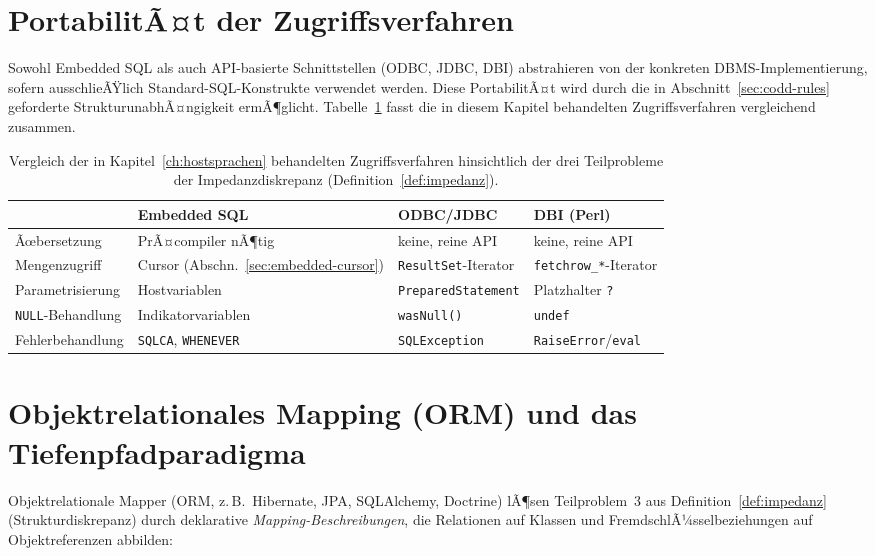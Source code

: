 ﻿\documentclass[a4paper,12pt]{report}
\theoremstyle{definition}
\theoremstyle{remark}
\begin{document}
\section{PortabilitÃ¤t der Zugriffsverfahren}
\label{sec:portabilitaet}

Sowohl Embedded SQL als auch API-basierte Schnittstellen (ODBC, JDBC,
DBI) abstrahieren von der konkreten DBMS-Implementierung, sofern
ausschlieÃŸlich Standard-SQL-Konstrukte verwendet werden. Diese
PortabilitÃ¤t wird durch die in Abschnitt~\ref{sec:codd-rules}
geforderte StrukturunabhÃ¤ngigkeit ermÃ¶glicht. Tabelle~\ref{tab:vergleich-zugriff}
fasst die in diesem Kapitel behandelten Zugriffsverfahren vergleichend
zusammen.

\begin{table}[H]
\centering
\small
\begin{tabular}{@{}lp{3.45cm}p{3.45cm}p{3.45cm}@{}}
\toprule
& \textbf{Embedded SQL} & \textbf{ODBC/JDBC} & \textbf{DBI (Perl)} \\
\midrule
Ãœbersetzung & PrÃ¤compiler nÃ¶tig & keine, reine API & keine, reine API \\
Mengenzugriff & Cursor (Abschn.~\ref{sec:embedded-cursor}) &
  \texttt{ResultSet}-Iterator & \texttt{fetchrow\_*}-Iterator \\
Parametrisierung & Hostvariablen & \texttt{PreparedStatement} &
  Platzhalter \texttt{?} \\
\texttt{NULL}-Behandlung & Indikatorvariablen & \texttt{wasNull()} &
  \texttt{undef} \\
Fehlerbehandlung & \texttt{SQLCA}, \texttt{WHENEVER} &
  \texttt{SQLException} & \texttt{RaiseError}/\texttt{eval} \\
\bottomrule
\end{tabular}
\caption{Vergleich der in Kapitel~\ref{ch:hostsprachen} behandelten
Zugriffsverfahren hinsichtlich der drei Teilprobleme der
Impedanzdiskrepanz (Definition~\ref{def:impedanz}).}
\label{tab:vergleich-zugriff}
\end{table}

\section{Objektrelationales Mapping (ORM) und das Tiefenpfadparadigma}
\label{sec:orm}

Objektrelationale Mapper (ORM, z.\,B.\ Hibernate, JPA, SQLAlchemy,
Doctrine) lÃ¶sen Teilproblem~3 aus Definition~\ref{def:impedanz}
(Strukturdiskrepanz) durch deklarative \emph{Mapping-Beschreibungen},
die Relationen auf Klassen und FremdschlÃ¼sselbeziehungen auf
Objektreferenzen abbilden:
\end{document}
